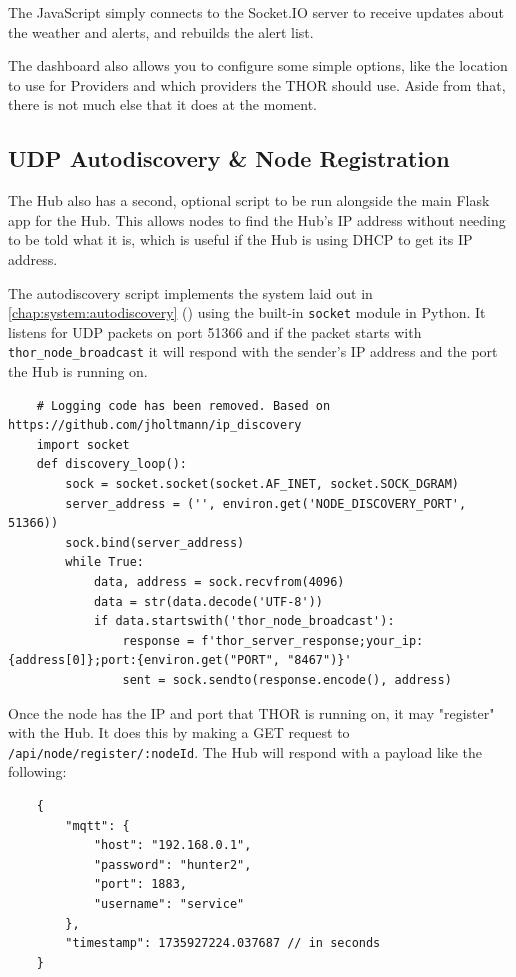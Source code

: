 The JavaScript simply connects to the Socket.IO server to receive updates about the weather and alerts, and rebuilds the alert list. 

The dashboard also allows you to configure some simple options, like the location to use for Providers and which providers the THOR should use. Aside from that, there is not much else that it does at the moment.

\subsection[Autodiscovery \& Registration]{UDP Autodiscovery \& Node Registration}
\label{chap:autodiscovery}
The Hub also has a second, optional script to be run alongside the main Flask app for the Hub. This allows nodes to find the Hub's IP address without needing to be told what it is, which is useful if the Hub is using DHCP to get its IP address.

The autodiscovery script implements the system laid out in \autoref{chap:system:autodiscovery} () using the built-in \texttt{socket} module in Python. It listens for UDP packets on port 51366 and if the packet starts with \texttt{thor\_node\_broadcast} it will respond with the sender's IP address and the port the Hub is running on.

\begin{lstlisting}
	# Logging code has been removed. Based on https://github.com/jholtmann/ip_discovery
	import socket
	def discovery_loop():
		sock = socket.socket(socket.AF_INET, socket.SOCK_DGRAM)
		server_address = ('', environ.get('NODE_DISCOVERY_PORT', 51366))
		sock.bind(server_address)
		while True:
			data, address = sock.recvfrom(4096)
			data = str(data.decode('UTF-8'))
			if data.startswith('thor_node_broadcast'):
				response = f'thor_server_response;your_ip:{address[0]};port:{environ.get("PORT", "8467")}'
				sent = sock.sendto(response.encode(), address)
\end{lstlisting}

Once the node has the IP and port that THOR is running on, it may "register" with the Hub. It does this by making a GET request to \texttt{/api/node/register/:nodeId}. The Hub will respond with a payload like the following:

\lstset{language=java}
\begin{lstlisting}
	{
		"mqtt": {
			"host": "192.168.0.1",
			"password": "hunter2",
			"port": 1883,
			"username": "service"
		},
		"timestamp": 1735927224.037687 // in seconds
	}
\end{lstlisting}
\lstset{language=python}

